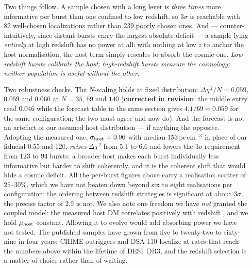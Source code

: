 \documentclass[11pt,a4paper]{article}
\begin{document}
Two things follow. A sample chosen with a long lever is \emph{three times} more informative per
burst than one confined to low redshift, so $3\sigma$ is reachable with $82$ well-chosen
localizations rather than $239$ poorly chosen ones. And --- counter-intuitively, since distant
bursts carry the largest absolute deficit --- a sample lying \emph{entirely} at high redshift has no
power at all: with nothing at low $z$ to anchor the host normalisation, the host term simply
rescales to absorb the cosmic one. \emph{Low-redshift bursts calibrate the host; high-redshift
bursts measure the cosmology; neither population is useful without the other.}

Two robustness checks. The $N$-scaling holds at fixed distribution:
$\Delta\chi^2/N = 0.059$, $0.059$ and $0.060$ at $N = 35$, $69$ and $140$ (\textbf{corrected in revision}: the middle entry read $0.046$ while the forecast table in the same section gives $4.1/69 = 0.059$ for the same configuration; the two must agree and now do). And the forecast is not
an artefact of our assumed host distribution --- if anything the opposite. Adopting the measured
one, $\sigma_{\rm host} = 0.96$ with median $153\,\mathrm{pc\,cm^{-3}}$ \citep{Host2025} in place
of our fiducial $0.55$ and $120$, \emph{raises} $\Delta\chi^2$ from $5.1$ to $6.6$ and lowers the
$3\sigma$ requirement from $123$ to $94$ bursts: a broader host makes each burst individually less
informative but harder to shift coherently, and it is the coherent shift that would hide a cosmic
deficit. All the per-burst figures above carry a realisation scatter of $25$--$30\%$, which we
have not beaten down beyond six to eight realisations per configuration; the ordering between
redshift strategies is significant at about $3\sigma$, the precise factor of $2.9$ is not.
We also note one freedom we have \emph{not} granted the coupled model: the measured host DM
correlates positively with redshift \citep{Host2025}, and we hold $\mu_{\rm host}$ constant.
Allowing it to evolve would add absorbing power we have not tested. The published samples have grown from five \citep{Macquart2020} to twenty-two
\citep{Yang2022} to sixty-nine \citep{Connor2025} in four years; CHIME outriggers and DSA-110
localize at rates that reach the numbers above within the lifetime of DESI~DR3, and the redshift
selection is a matter of choice rather than of waiting.
\end{document}
